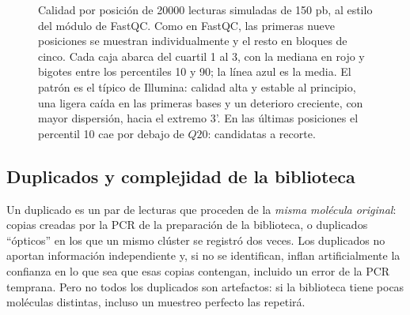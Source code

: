 \begin{figure}[t]
\centering
%
\caption[Calidad por posición al estilo FastQC]{Calidad por posición de \num{20000} lecturas simuladas de 150 pb, al estilo del módulo  de FastQC. Como en FastQC, las primeras nueve posiciones se muestran individualmente y el resto en bloques de cinco. Cada caja abarca del cuartil 1 al 3, con la mediana en rojo y bigotes entre los percentiles 10 y 90; la línea azul es la media. El patrón es el típico de Illumina: calidad alta y estable al principio, una ligera caída en las primeras bases y un deterioro creciente, con mayor dispersión, hacia el extremo 3'. En las últimas posiciones el percentil 10 cae por debajo de $Q20$: candidatas a recorte.}
\label{fig:06-fastqc}
\end{figure}

\subsection{Duplicados y complejidad de la biblioteca}

Un duplicado es un par de lecturas que proceden de la \emph{misma molécula original}: copias creadas por la PCR de la preparación de la biblioteca, o duplicados ``ópticos'' en los que un mismo clúster se registró dos veces. Los duplicados no aportan información independiente y, si no se identifican, inflan artificialmente la confianza en lo que sea que esas copias contengan, incluido un error de la PCR temprana. Pero no todos los duplicados son artefactos: si la biblioteca tiene pocas moléculas distintas, incluso un muestreo perfecto las repetirá.

